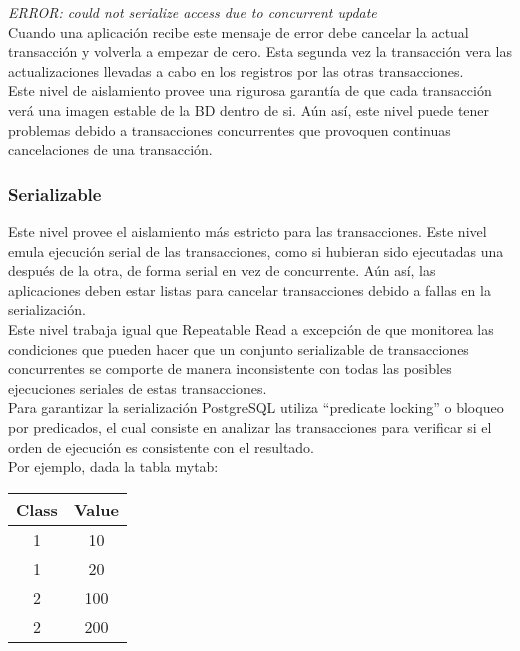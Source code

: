 \textit{ERROR: could not serialize access due to concurrent update}\\

Cuando una aplicación recibe este mensaje de error debe cancelar la actual transacción y volverla a empezar de cero. Esta segunda vez la transacción vera las actualizaciones llevadas a cabo en los registros por las otras transacciones.\\

Este nivel de aislamiento provee una rigurosa garantía de que cada transacción verá una imagen estable de la BD dentro de si. Aún así, este nivel puede tener problemas debido a transacciones concurrentes que provoquen continuas cancelaciones de una transacción.

\subsubsection{Serializable}

Este nivel provee el aislamiento más estricto para las transacciones. Este nivel emula ejecución serial de las transacciones, como si hubieran sido ejecutadas una después de la otra, de forma serial en vez de concurrente. Aún así, las aplicaciones deben estar listas para cancelar transacciones debido a fallas en la serialización.\\

Este nivel trabaja igual que Repeatable Read a excepción de que monitorea las condiciones que pueden hacer que un conjunto serializable de transacciones concurrentes se comporte de manera inconsistente con todas las posibles ejecuciones seriales de estas transacciones.\\

Para garantizar la serialización PostgreSQL utiliza “predicate locking” o bloqueo por predicados, el cual consiste en analizar las transacciones para verificar si el orden de ejecución es consistente con el resultado.\\

Por ejemplo, dada la tabla mytab:\\

\begin{table}[h]
\centering
\begin{tabular}{|c|c|} \hline
Class & Value       \\ \hline
1     & 10          \\ \hline
1     & 20          \\ \hline
2     & 100         \\ \hline
2     & 200         \\ \hline
\end{tabular}
\end{table}

